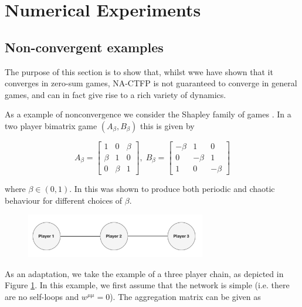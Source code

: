 \documentclass{article}
\theoremstyle{definition}
\begin{document}
	\section{Numerical Experiments}

	\subsection{Non-convergent examples}
	The purpose of this section is to show that, whilst wwe have shown that it converges in zero-sum games, NA-CTFP is not guaranteed to converge in general games, and can in fact give rise to a rich variety of dynamics.

	
	
	As a example of nonconvergence we consider the Shapley family of games \cite{}. In a two player bimatrix game $(A_\beta, B_\beta)$ this is given by

	\begin{equation}
		A_\beta = \begin{bmatrix}
			1 & 0 & \beta \\
			\beta & 1 & 0 \\
			0 & \beta & 1
		\end{bmatrix}, \; B_\beta =  \begin{bmatrix}
			- \beta & 1 & 0 \\
			0 & -\beta & 1 \\
			1 & 0 & -\beta
		\end{bmatrix}
	\end{equation}

	where $\beta \in (0, 1)$. In \cite{} this was shown to produce both periodic and chaotic behaviour for different choices of $\beta$. 

	\begin{figure}[t]
		\centering
		\includegraphics[width = 0.7\textwidth]{Figures/ThreePlayerNetwork.png}
		\caption{\label{fig::ThreePlayerNetwork}}
	\end{figure}

	As an adaptation, we take the example of a three player chain, as depicted in Figure \ref{fig::ThreePlayerNetwork}. In this example, we first assume that the network is simple (i.e. there are no self-loops and $w^{\mu \mu} = 0$). The aggregation matrix can be given as
\end{document}
